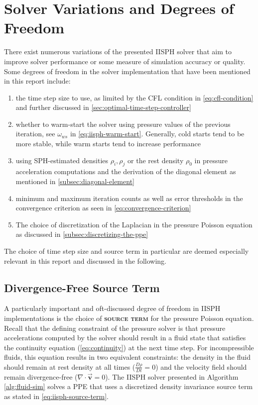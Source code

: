 \documentclass[oneside, a4paper]{book}
\newcommand\emphasis[1]{{\scshape\bfseries#1}}
\newcommand\vek[1]{\vec{\bm{#1}}}
\newcommand\divergence{{\nabla\cdot}}
\begin{document}
    \section{Solver Variations and Degrees of Freedom}\label{sec:solver-variations}
    There exist numerous variations of the presented IISPH solver that aim to improve solver performance or some measure of simulation accuracy or quality. Some degrees of freedom in the solver implementation that have been mentioned in this report include: 
    \begin{enumerate}
      \item the time step size to use, as limited by the CFL condition in \autoref{eq:cfl-condition} and further discussed in \autoref{sec:optimal-time-step-controller}
      \item whether to warm-start the solver using pressure values of the previous iteration, see $\omega_{ws}$ in \autoref{eq:iisph-warm-start}. Generally, cold starts tend to be more stable, while warm starts tend to increase performance
      \item using SPH-estimated densities $\rho_i, \rho_j$ or the rest density $\rho_0$ in pressure acceleration computations and the derivation of the diagonal element as mentioned in \autoref{subsec:diagonal-element}
      \item minimum and maximum iteration counts as well as error thresholds in the convergence criterion as seen in \autoref{eq:convergence-criterion}
      \item The choice of discretization of the Laplacian in the pressure Poisson equation as discussed in \autoref{subsec:discretizing-the-ppe}
    \end{enumerate}

    The choice of time step size and source term in particular are deemed especially relevant in this report and discussed in the following.

    \subsection{Divergence-Free Source Term}\label{sec:alternative-source-terms}

    A particularly important and oft-discussed degree of freedom in IISPH implementations is the choice of \emphasis{source term} for the pressure Poisson equation. Recall that the defining constraint of the pressure solver is that pressure accelerations computed by the solver should result in a fluid state that satisfies the continuity equation (\autoref{eq:continuity}) at the next time step. For incompressible fluids, this equation results in two equivalent constraints: the density in the fluid should remain at rest density at all times ($\frac{D\rho}{D t}=0$) and the velocity field should remain divergence-free ($\divergence \vek{v}=0$). The IISPH solver presented in Algorithm \ref{alg:fluid-sim} solves a PPE that uses a discretized density invariance source term as stated in \autoref{eq:iisph-source-term}. 
    
\end{document}
